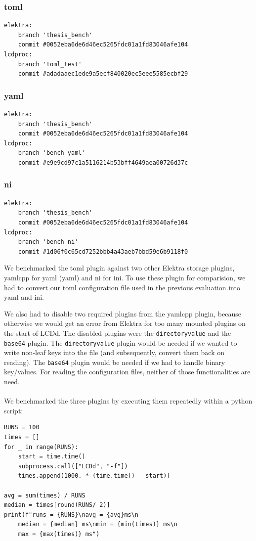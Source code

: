 \documentclass[draft,final]{vutinfth} %
\begin{document}
\subsubsection{\acrshort{toml}}
\begin{Verbatim}[frame=single, fontsize=\small]
elektra:
    branch 'thesis_bench'
    commit #0052eba6de6d46ec5265fdc01a1fd83046afe104
lcdproc:
    branch 'toml_test'
    commit #adadaaec1ede9a5ecf840020ec5eee5585ecbf29
\end{Verbatim}
\subsubsection{\acrshort{yaml}}
\begin{Verbatim}[frame=single, fontsize=\small]
elektra:
    branch 'thesis_bench'
    commit #0052eba6de6d46ec5265fdc01a1fd83046afe104
lcdproc:
    branch 'bench_yaml'
    commit #e9e9cd97c1a5116214b53bff4649aea00726d37c
\end{Verbatim}

\subsubsection{ni}
\begin{Verbatim}[frame=single, fontsize=\small]
elektra:
    branch 'thesis_bench'
    commit #0052eba6de6d46ec5265fdc01a1fd83046afe104
lcdproc:
    branch 'bench_ni'
    commit #1d06f0c65cd7252bbb4a43aeb7bbd59e6b9118f0
\end{Verbatim}

We benchmarked the \acrshort{toml} plugin against two other Elektra storage plugins, yamlcpp for \acrshort{yaml} (\acrlong{yaml}) and ni for \acrshort{ini}.
To use these plugin for comparision, we had to convert our \acrshort{toml} configuration file used in the previous evaluation into \acrshort{yaml} and \acrshort{ini}.

We also had to disable two required plugins from the yamlcpp plugin, because otherwise we would get an error from Elektra for too many mounted plugins on the start of LCDd.
The disabled plugins were the \texttt{directoryvalue} and the \texttt{base64} plugin.
The \texttt{directoryvalue} plugin would be needed if we wanted to write non-leaf keys into the file (and subsequently, convert them back on reading).
The \texttt{base64} plugin would be needed if we had to handle binary key/values.
For reading the configuration files, neither of those functionalities are need.
\\\\
We benchmarked the three plugins by executing them repeatedly within a python script:
\begin{Verbatim}[frame=single, fontsize=\small]
RUNS = 100
times = []
for _ in range(RUNS):
	start = time.time()
	subprocess.call(["LCDd", "-f"])
	times.append(1000. * (time.time() - start))

avg = sum(times) / RUNS
median = times[round(RUNS/ 2)]
print(f"runs = {RUNS}\navg = {avg}ms\n
    median = {median} ms\nmin = {min(times)} ms\n
    max = {max(times)} ms")
\end{Verbatim}
\end{document}
